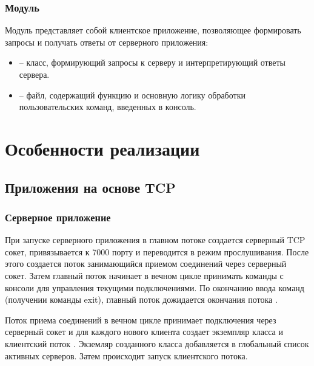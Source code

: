 \subsubsection{Модуль }

Модуль  представляет собой клиентское приложение, позволяющее формировать запросы и получать ответы от серверного приложения:
\begin{itemize}
	\item {} -- класс, формирующий запросы к серверу и интерпретирующий ответы сервера.
	\item {} -- файл, содержащий функцию  и основную логику обработки пользовательских команд, введенных в консоль.
\end{itemize}

\section{Особенности реализации}


\subsection{Приложения на основе TCP}

\subsubsection{Серверное приложение}

При запуске серверного приложения в главном потоке создается серверный TCP сокет, привязывается к 7000 порту и переводится в режим прослушивания. После этого создается поток  занимающийся приемом соединений через серверный сокет. Затем главный поток начинает в вечном цикле принимать команды с консоли для управления текущими подключениями. По окончанию ввода команд (получении команды exit), главный поток дожидается окончания потока .

Поток приема соединений  в вечном цикле принимает подключения через серверный сокет и для каждого нового клиента создает экземпляр класса  и клиентский поток . Экземляр созданного класса добавляется в глобальный список активных серверов. Затем происходит запуск клиентского потока. 

